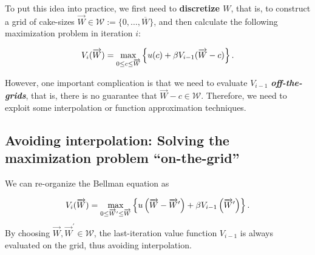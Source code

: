 \documentclass[12pt]{article}
\theoremstyle{definition}
\begin{document}
To put this idea into practice, we first need to {\bf discretize $W$}, that is, to construct a grid of cake-sizes $\overrightarrow{W} \in \mathcal{W} := \{0, \ldots, \overline{W}\}$, and then calculate the following maximization problem in iteration $i$:

\begin{equation}
    \notag
    V_i(\overrightarrow{W})=\max _{0 \leq c \leq \overrightarrow{W}}\left\{u(c)+\beta V_{i-1}(\overrightarrow{W}-c)\right\}.
\end{equation}

However, one important complication is that we need to evaluate $V_{i-1}$ {\bf \emph{off-the-grids}}, that is, there is no guarantee that $\overrightarrow{W}-c \in \mathcal{W}$. Therefore, we need to exploit some interpolation or function approximation techniques.

\subsection{Avoiding interpolation: Solving the maximization problem ``on-the-grid''}

We can re-organize the Bellman equation as 

\begin{equation}
    \notag 
    V_i(\overrightarrow{W})=\max _{0 \leq \overrightarrow{W}^{\prime} \leq \overrightarrow{W}}\left\{u\left(\overrightarrow{W}-\overrightarrow{W}^{\prime}\right)+\beta V_{i-1}\left(\overrightarrow{W}^{\prime}\right)\right\}.
\end{equation}
By choosing $\overrightarrow{W}, \overrightarrow{W}^{\prime} \in \mathcal{W}$, the last-iteration value function $V_{i-1}$ is always evaluated on the grid, thus avoiding interpolation. 
\end{document}
